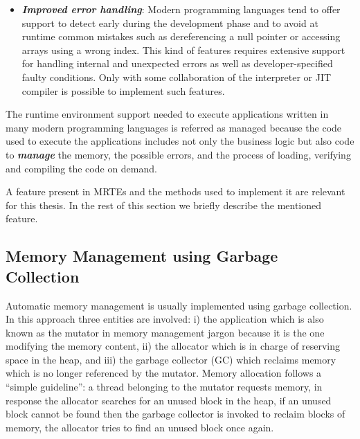 \begin{itemize}
\item \textbf{\textit{Improved error handling}}:
Modern programming languages tend to offer support to detect early during the development phase and to avoid at runtime common mistakes such as dereferencing a null pointer or accessing arrays using a wrong index.
This kind of features requires extensive support for handling internal and unexpected errors as well as developer-specified faulty conditions.
Only with some collaboration of the interpreter or JIT compiler is possible to implement such features.
\end{itemize}   

The runtime environment support needed to execute applications written in many modern programming languages is referred as managed because the code used to execute the applications includes not only the business logic but also code to \textit{\textbf{manage}} the memory, the possible errors, and the process of loading, verifying and compiling the code on demand.

A feature present in MRTEs and the methods used to implement it are relevant for this thesis.
In the rest of this section we briefly describe the mentioned feature.

\subsection{Memory Management using Garbage Collection}

Automatic memory management is usually implemented using garbage collection.
In this approach three entities are involved: i) the application which is also known as the mutator in memory management jargon because it is the one modifying the memory content, ii) the allocator which is in charge of reserving space in the heap, and iii) the garbage collector (GC) which reclaims memory which is no longer referenced by the mutator.
Memory allocation follows a ``simple guideline'': a thread belonging to the mutator requests memory, in response the allocator searches for an unused block in the heap, if an unused block cannot be found then the garbage collector is invoked to reclaim blocks of memory, the allocator tries to find an unused block once again.

